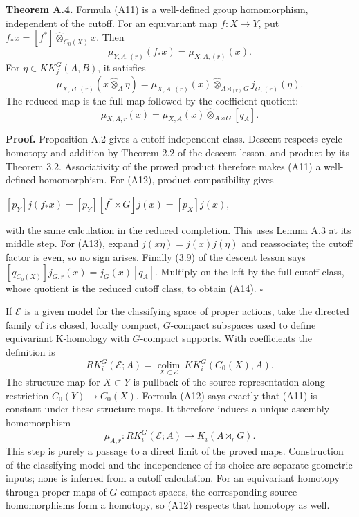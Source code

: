 \documentclass[
  11pt,
]{article}
\begin{document}
\textbf{Theorem A.4.} Formula (A11) is a well-defined group
homomorphism, independent of the cutoff. For an equivariant map
\(f:X\to Y\), put \(f_*x=[f^*]\widehat\otimes_{C_0(X)}x\). Then \[
\mu_{Y,A,(r)}(f_*x)=\mu_{X,A,(r)}(x).
\tag{A12}
\] For \(\eta\in KK_j^G(A,B)\), it satisfies \[
\mu_{X,B,(r)}(x\widehat\otimes_A\eta)
=\mu_{X,A,(r)}(x)\widehat\otimes_{A\rtimes_{(r)}G}j_{G,(r)}(\eta).
\tag{A13}
\] The reduced map is the full map followed by the coefficient quotient:
\[
\mu_{X,A,r}(x)=\mu_{X,A}(x)\widehat\otimes_{A\rtimes G}[q_A].
\tag{A14}
\]

\textbf{Proof.} Proposition A.2 gives a cutoff-independent class.
Descent respects cycle homotopy and addition by Theorem 2.2 of the
descent lesson, and product by its Theorem 3.2. Associativity of the
proved product therefore makes (A11) a well-defined homomorphism. For
(A12), product compatibility gives

\([p_Y]j(f_*x)=[p_Y][f^*\rtimes G]j(x)=[p_X]j(x)\),

with the same calculation in the reduced completion. This uses Lemma A.3
at its middle step. For (A13), expand \(j(x\eta)=j(x)j(\eta)\) and
reassociate; the cutoff factor is even, so no sign arises. Finally (3.9)
of the descent lesson says \([q_{C_0(X)}]j_{G,r}(x)=j_G(x)[q_A]\).
Multiply on the left by the full cutoff class, whose quotient is the
reduced cutoff class, to obtain (A14). \(\square\)

If \(\mathcal E\) is a given model for the classifying space of proper
actions, take the directed family of its closed, locally compact,
\(G\)-compact subspaces used to define equivariant K-homology with
\(G\)-compact supports. With coefficients the definition is \[
RK_i^G(\mathcal E;A)=\underset{X\subset\mathcal E}{\operatorname{colim}}\,
KK_i^G(C_0(X),A).
\tag{A15}
\] The structure map for \(X\subset Y\) is pullback of the source
representation along restriction \(C_0(Y)\to C_0(X)\). Formula (A12)
says exactly that (A11) is constant under these structure maps. It
therefore induces a unique assembly homomorphism \[
\mu_{A,r}:RK_i^G(\mathcal E;A)\longrightarrow K_i(A\rtimes_rG).
\tag{A16}
\] This step is purely a passage to a direct limit of the proved maps.
Construction of the classifying model and the independence of its choice
are separate geometric inputs; none is inferred from a cutoff
calculation. For an equivariant homotopy through proper maps of
\(G\)-compact spaces, the corresponding source homomorphisms form a
homotopy, so (A12) respects that homotopy as well.
\end{document}
